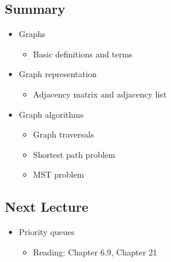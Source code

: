 \documentclass[
  10pt,
  english,
  letterpaper,
,tablecaptionabove
]{scrartcl}
\providecommand{\tightlist}{%
  \setlength{\itemsep}{0pt}\setlength{\parskip}{0pt}}
\begin{document}
\hypertarget{summary}{%
\subsection{Summary}\label{summary}}

\begin{itemize}
\tightlist
\item
  Graphs

  \begin{itemize}
  \tightlist
  \item
    Basic definitions and terms
  \end{itemize}
\item
  Graph representation

  \begin{itemize}
  \tightlist
  \item
    Adjacency matrix and adjacency list
  \end{itemize}
\item
  Graph algorithms

  \begin{itemize}
  \tightlist
  \item
    Graph traversals
  \item
    Shortest path problem
  \item
    MST problem
  \end{itemize}
\end{itemize}

\hypertarget{next-lecture}{%
\subsection{Next Lecture}\label{next-lecture}}

\begin{itemize}
\tightlist
\item
  Priority queues

  \begin{itemize}
  \tightlist
  \item
    Reading: Chapter 6.9, Chapter 21
  \end{itemize}
\end{itemize}
\end{document}
